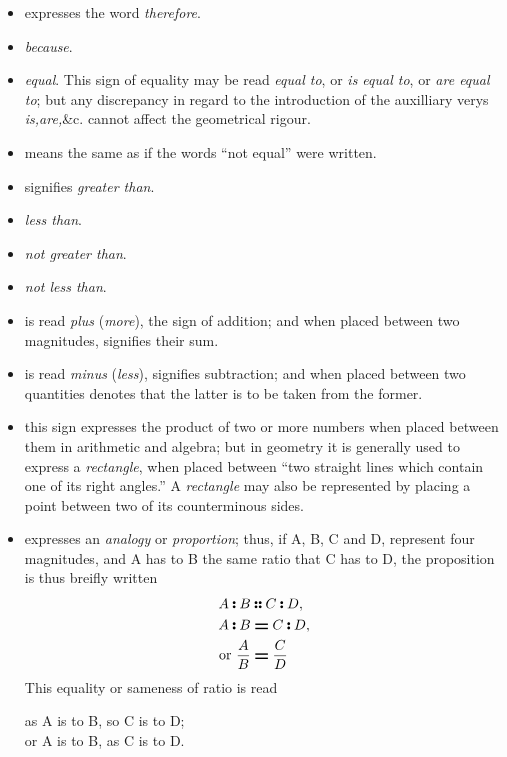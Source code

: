 \documentclass{article}
\begin{document}
\begin{itemize}
\item[\therefore] expresses the word \textit{therefore}.
\item[\because]  \textit{because}.
\item[\equals]  \textit{equal}. This sign of equality may be read \textit{equal to}, or \textit{is equal to}, or \textit{are equal to}; but any discrepancy in regard to the introduction of the auxilliary verys \textit{is,are,}\&c. cannot affect the geometrical rigour. 
\item[\notequals] means the same as if the words ``not equal'' were written.\item[\greater] signifies \textit{greater than}.
\item[\less]  \textit{less than}.
\item[\notgreater] \textit{not greater than}.
\item[\notless] \textit{not less than}. 
\item[\plus] is read \textit{plus} (\textit{more}), the sign of addition; and when placed between two magnitudes, signifies their sum. 
\item[\minus] is read \textit{minus} (\textit{less}), signifies subtraction; and when placed between two quantities denotes that the latter is to be taken from the former. 
\item[\cross] this sign expresses the product of two or more numbers when placed between them in arithmetic and algebra; but in geometry it is generally used to express a \textit{rectangle}, when placed between ``two straight lines which contain one of its right angles.'' A \textit{rectangle} may also be represented by placing a point between two of its counterminous sides. 
\item[\isto \as \isto] expresses an \textit{analogy} or \textit{proportion}; thus, if A, B, C and D, represent four magnitudes, and A has to B the same ratio that C has to D, the proposition is thus breifly written 
\begin{align*}
A \isto B &\as C \isto D,\\
A \isto B &\equals C \isto D,\\
\text{or } \frac{A}{B} &\equals \frac{C}{D}
\end{align*}
This equality or sameness of ratio is read 
\begin{center}
as A is to B, so C is to D; \\
or A is to B, as C is to D.
\end{center}

\end{itemize}
\end{document}
